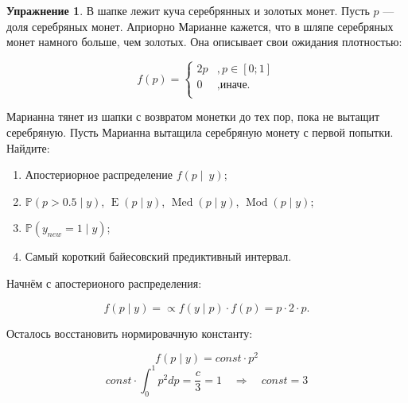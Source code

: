 \documentclass[12pt, a4paper, oneside]{extreport}
\DeclareMathOperator{\E}{\mathop{E}}
\DeclareMathOperator{\Med}{Med}
\DeclareMathOperator{\Mod}{Mod}
\def \mbb{\mathbb}
\def \PP{\mbb{P}}
\theoremstyle{plain}              %
\theoremstyle{definition}         %
\newtheorem{problem}{\color{myblue} Упражнение}
\begin{document}
\begin{problem}\label{upr2}
В шапке лежит куча серебрянных и золотых монет. Пусть $p$ --- доля серебряных монет. Априорно Марианне кажется, что в шляпе серебряных монет намного больше, чем золотых. Она описывает свои ожидания плотностью: 

\[ f(p) = \begin{cases}
2p&, p \in [0;1] \\
0&, \text{иначе.}\\
\end{cases} \]

Марианна тянет из шапки с возвратом монетки до тех пор, пока не вытащит серебряную. Пусть Марианна вытащила серебряную монету с первой попытки. Найдите:

\begin{enumerate}
\item Апостериорное распределение $f(p \mid~y)$;
\item $\PP(p > 0.5 \mid y)$, $\E(p \mid y)$,  $\Med(p \mid y)$,  $\Mod(p \mid y)$;
\item  $\PP(y_{new} = 1 \mid y)$;
\item Самый короткий байесовский предиктивный интервал.
\end{enumerate}
	
\begin{sol}
 Начнём с апостерионого распределения:
			
\[ f(p \mid y) =  \propto  f(y \mid p) \cdot f(p)  =   p \cdot 2 \cdot p.\]

Осталось восстановить нормировачную константу:

\[ f(p \mid y) = const \cdot p^2 \]
\[ const \cdot \int_0^1 p^2 dp = \frac{c}{3} = 1 \quad \Rightarrow \quad const = 3 \]


\end{sol}
\end{problem}
\end{document}

